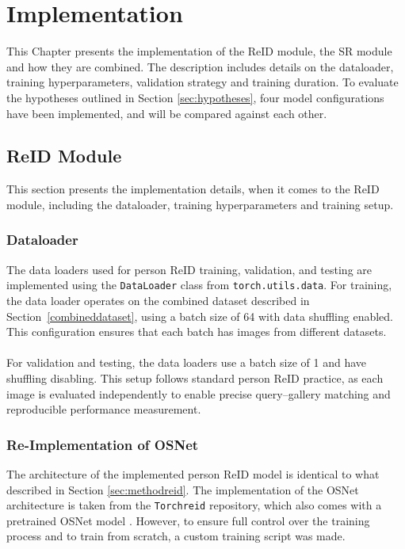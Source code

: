 \chapter{Implementation} \label{cha: implementation}
This Chapter presents the implementation of the \acs{ReID} module, the \acs{SR} module and how they are combined. The description includes details on the dataloader, training hyperparameters, validation strategy and training duration. To evaluate the hypotheses outlined in Section \ref{sec:hypotheses}, four model configurations have been implemented, and will be compared against each other.

\section{ReID Module}
This section presents the implementation details, when it comes to the \acs{ReID} module, including the dataloader, training hyperparameters and training setup. 

\subsection{Dataloader}
The data loaders used for person \acs{ReID} training, validation, and testing are implemented using the \texttt{DataLoader} class from \texttt{torch.utils.data}. For training, the data loader operates on the combined dataset described in Section~\ref{combineddataset}, using a batch size of 64 with data shuffling enabled. This configuration ensures that each batch has images from different datasets.
\\\\
For validation and testing, the data loaders use a batch size of 1 and have shuffling disabling. This setup follows standard person \acs{ReID} practice, as each image is evaluated independently to enable precise query–gallery matching and reproducible performance measurement.

\subsection{Re-Implementation of OSNet}\label{sec:implementationosnet}
The architecture of the implemented person \acs{ReID} model is identical to what described in Section \ref{sec:methodreid}. The implementation of the \acf{OSNet} architecture is taken from the \texttt{Torchreid} repository, which also comes with a pretrained \acs{OSNet} model \cite{TorchReIDM1501}. However, to ensure full control over the training process and to train from scratch, a custom training script was made. 

